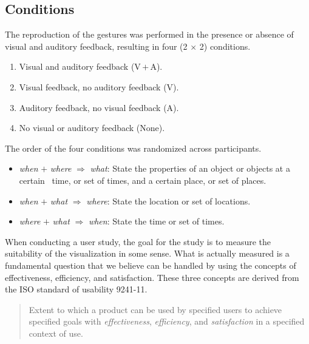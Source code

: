 \documentclass[prodmode,acmtap]{acmlarge}
\begin{document}
\subsection{Conditions}
The reproduction of the gestures was performed in the presence or
absence of visual and auditory feedback, resulting in four (2 $\times$ 2) conditions.
\begin{enumerate}
\item Visual and auditory feedback (V\,$+$\,A).
\item Visual feedback, no auditory feedback (V).
\item Auditory feedback, no visual feedback (A).
\item No visual or auditory feedback (None).
\end{enumerate}
The order of the four conditions was randomized across participants.
\begin{itemize}
    \item \textit{when} $+$ \textit{where} $\Rightarrow$
          \textit{what}: State the properties of an object or objects at a
          certain ~time, or set of times,  and a certain place, or set of places.
    \item \textit{when} $+$ \textit{what} $\Rightarrow$
          \textit{where}: State the location or set of locations.
    \item \textit{where} $+$ \textit{what} $\Rightarrow$
          \textit{when}: State the time or set of times.
\end{itemize}
When conducting a user study, the goal for the study is to measure
the suitability of the visualization in some sense. What is actually
measured is a fundamental question that we believe can be handled by
using the concepts of {effectiveness}, {efficiency},
and {satisfaction}. These three concepts are derived from the
ISO standard of usability 9241-11.
\begin{quote}
    Extent to which a product can be used by specified users to
    achieve specified goals with \textit{effectiveness},
    \textit{efficiency}, and \textit{satisfaction} in a specified context of use.
\end{quote}
\end{document}
